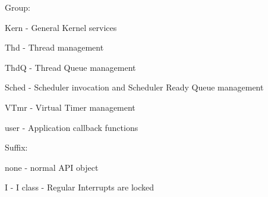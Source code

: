 \begin{DoxyItemize}
\item Group\-:
\begin{DoxyItemize}
\item {\ttfamily Kern} -\/ General Kernel services
\item {\ttfamily Thd} -\/ Thread management
\item {\ttfamily Thd\-Q} -\/ Thread Queue management
\item {\ttfamily Sched} -\/ Scheduler invocation and Scheduler Ready Queue management
\item {\ttfamily V\-Tmr} -\/ Virtual Timer management
\item {\ttfamily user} -\/ Application callback functions
\end{DoxyItemize}
\item Suffix\-:
\begin{DoxyItemize}
\item {\ttfamily none} -\/ normal A\-P\-I object
\item {\ttfamily I} -\/ I class -\/ Regular Interrupts are locked
\end{DoxyItemize}
\end{DoxyItemize}

